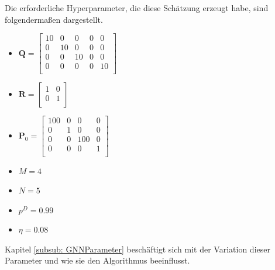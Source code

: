 \documentclass[10pt,a4paper]{article}
\begin{document}
Die erforderliche Hyperparameter, die diese Schätzung erzeugt habe, sind folgendermaßen dargestellt.\\
\begin{itemize}
  \item $\textbf{Q} = \begin{bmatrix}
10 &0 &0&0&0 \\
0 &10 &0&0&0\\
0 &0 &10&0&0\\
0 &0 &0&0&10\\
\end{bmatrix}$
  \item $\textbf{R} = \begin{bmatrix}
1 &0  \\
0 &1\\
\end{bmatrix}$
  \item $\textbf{P}_0 = \begin{bmatrix}
100 &0 &0&0 \\
0 &1 &0&0\\
0 &0 &100&0\\
0 &0 &0&1\\
\end{bmatrix}$
   \item $M = 4$
   \item $N = 5$
   \item $p^D = 0.99$
   \item $\eta = 0.08$
\end{itemize}
Kapitel \ref{subsub: GNNParameter} beschäftigt sich mit der Variation dieser Parameter und wie sie den Algorithmus beeinflusst.\\
\end{document}
